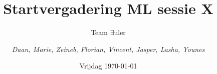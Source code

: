 \documentclass{article}
\title{Startvergadering ML sessie X}
\author{Team $\exists$uler \and
	\textit{Daan, Marie, Zeineb, Florian, Vincent, Jasper, Lasha, Younes}}
\date{Vrijdag \today}
\begin{document}
	
	\maketitle
	
	\section*{}
	
\end{document}
